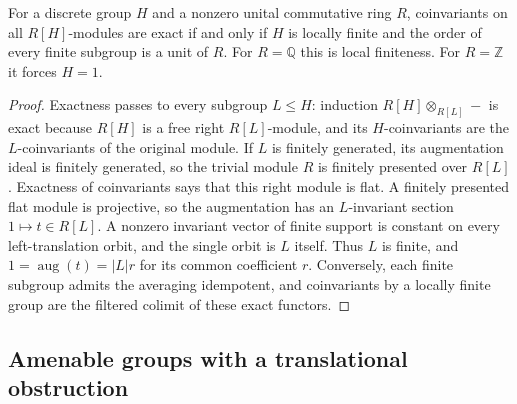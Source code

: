 \begin{proposition}
\label{A:discrete}
For a discrete group $H$ and a nonzero unital commutative ring $R$,
coinvariants on all $R[H]$-modules are exact if and only if $H$ is
locally finite and the order of every finite subgroup is a unit of
$R$. For $R=\mathbb Q$ this is local finiteness. For $R=\mathbb Z$
it forces $H=1$.
\end{proposition}
\begin{proof}
Exactness passes to every subgroup $L\leq H$: induction
$R[H]\otimes_{R[L]}-$ is exact because $R[H]$ is a free right
$R[L]$-module, and its $H$-coinvariants are the $L$-coinvariants of the
original module. If $L$ is finitely generated, its augmentation ideal
is finitely generated, so the trivial module $R$ is finitely presented
over $R[L]$. Exactness of coinvariants says that this right module is
flat. A finitely presented flat module is projective, so the
augmentation has an $L$-invariant section $1\mapsto t\in R[L]$.
A nonzero invariant vector of finite support is constant on every
left-translation orbit, and the single orbit is $L$ itself. Thus $L$
is finite, and $1=\operatorname{aug}(t)=|L|r$ for its common coefficient
$r$. Conversely, each finite subgroup admits the averaging idempotent,
and coinvariants by a locally finite group are the filtered colimit
of these exact functors.
\end{proof}

\subsection{Amenable groups with a translational obstruction}

